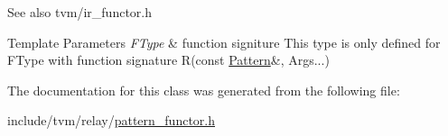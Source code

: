 \begin{DoxySeeAlso}{See also}
tvm/ir\+\_\+functor.\+h
\end{DoxySeeAlso}

\begin{DoxyTemplParams}{Template Parameters}
{\em F\+Type} & function signiture This type is only defined for F\+Type with function signature R(const \hyperlink{classtvm_1_1relay_1_1Pattern}{Pattern}\&, Args...) \\
\hline
\end{DoxyTemplParams}


The documentation for this class was generated from the following file\+:\begin{DoxyCompactItemize}
\item 
include/tvm/relay/\hyperlink{pattern__functor_8h}{pattern\+\_\+functor.\+h}\end{DoxyCompactItemize}
